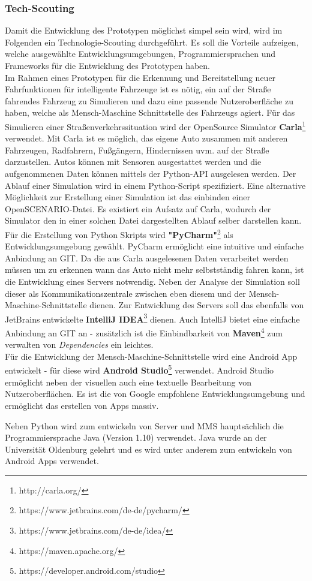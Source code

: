 \subsubsection{Tech-Scouting}
Damit die Entwicklung des Prototypen möglichst simpel sein wird, wird im Folgenden ein Technologie-Scouting durchgeführt. Es soll die Vorteile aufzeigen, welche ausgewählte Entwicklungsumgebungen, Programmiersprachen und Frameworks für die Entwicklung des Prototypen haben.\\

Im Rahmen eines Prototypen für die Erkennung und Bereitstellung neuer Fahrfunktionen für intelligente Fahrzeuge ist es nötig, ein auf der Straße fahrendes Fahrzeug zu Simulieren und dazu eine passende Nutzeroberfläche zu haben, welche als Mensch-Maschine Schnittstelle des Fahrzeugs agiert. Für das Simulieren einer Straßenverkehrssituation wird der OpenSource Simulator \textbf{Carla}\footnote{http://carla.org/} verwendet.
Mit Carla ist es möglich, das eigene Auto zusammen mit anderen Fahrzeugen, Radfahrern, Fußgängern, Hindernissen uvm. auf der Straße darzustellen. Autos können mit Sensoren ausgestattet werden und die aufgenommenen Daten können mittels der Python-API ausgelesen werden. Der Ablauf einer Simulation wird in einem Python-Script spezifiziert. Eine alternative Möglichkeit zur Erstellung einer Simulation ist das einbinden einer OpenSCENARIO-Datei. Es existiert ein Aufsatz auf Carla, wodurch der Simulator den in einer solchen Datei dargestellten Ablauf selber darstellen kann.\\

Für die Erstellung von Python Skripts wird \textbf{"PyCharm"}\footnote{https://www.jetbrains.com/de-de/pycharm/} als Entwicklungsumgebung gewählt. PyCharm ermöglicht eine intuitive und einfache Anbindung an GIT. Da die aus Carla ausgelesenen Daten verarbeitet werden müssen um zu erkennen wann das Auto nicht mehr selbstständig fahren kann, ist die Entwicklung eines Servers notwendig. Neben der Analyse der Simulation soll dieser als Kommunikationszentrale zwischen eben diesem und der Mensch-Maschine-Schnittstelle dienen. Zur Entwicklung des Servers soll das ebenfalls von JetBrains entwickelte \textbf{IntelliJ IDEA}\footnote{https://www.jetbrains.com/de-de/idea/} dienen. Auch IntelliJ bietet eine einfache Anbindung an GIT an - zusätzlich ist die Einbindbarkeit von \textbf{Maven}\footnote{https://maven.apache.org/} zum verwalten von \textit{Dependencies} ein leichtes.\\

Für die Entwicklung der Mensch-Maschine-Schnittstelle wird eine Android App entwickelt - für diese wird \textbf{Android Studio}\footnote{https://developer.android.com/studio} verwendet. Android Studio ermöglicht neben der visuellen auch eine textuelle Bearbeitung von Nutzeroberflächen. Es ist die von Google empfohlene Entwicklungsumgebung und ermöglicht das erstellen von Apps massiv.

Neben Python wird zum entwickeln von Server und MMS hauptsächlich die Programmiersprache Java (Version 1.10) verwendet. Java wurde an der Universität Oldenburg gelehrt und es wird unter anderem zum entwickeln von Android Apps verwendet.